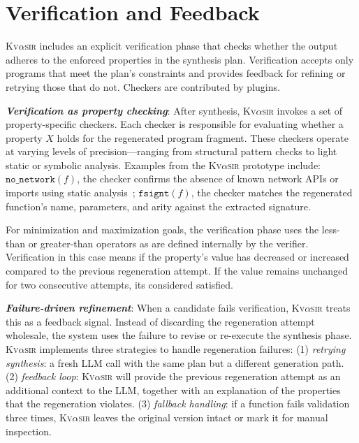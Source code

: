 \documentclass[nonacm,sigplan]{acmart}
\newcommand{\sys}{{\scshape Kv{$\alpha$}sir}\xspace}
\newcommand{\heading}[1]{\vspace{2pt}\noindent\textbf{\emph{#1}}:\enspace}
\newcommand{\ttt}[1]{\texttt{#1}\xspace}
\begin{document}
\section{Verification and Feedback}
\label{sec:verification}

\sys includes an explicit verification phase that checks whether the output adheres to the enforced properties in the synthesis plan. 
Verification accepts only programs that meet the plan's constraints and
provides feedback for refining or retrying those that do not.
Checkers are contributed by plugins.

\heading{Verification as property checking}
After synthesis, \sys invokes a set of property-specific checkers.
Each checker
is responsible for evaluating whether a property $X$ holds
for the regenerated program fragment.
These checkers operate at varying levels
of precision---ranging from structural pattern checks to light static or
symbolic analysis.
Examples from the \sys prototype include:
  $\ttt{no\_network}(f)$, the checker confirms the absence of known network APIs or imports using static analysis~\cite{mir:ccs:2021};
  $\ttt{fsignt}(f)$, the checker matches the regenerated function's name, parameters, and arity against the extracted signature.

For minimization and maximization goals, the verification phase uses the less-than or greater-than operators as are defined internally by the verifier.
Verification in this case means if the property's value has decreased or increased compared 
to the previous regeneration attempt.
If the value remains unchanged for two consecutive attempts, its considered satisfied.

\heading{Failure-driven refinement}
When a candidate fails verification, \sys treats this as a feedback signal. Instead of discarding the regeneration attempt wholesale, the system uses the failure to revise or re-execute the synthesis phase.
\sys implements three strategies to handle regeneration failures:
  (1) \emph{retrying synthesis}: a fresh LLM call with the same plan but a different generation path.
  (2) \emph{feedback loop}: \sys will provide the previous regeneration attempt 
    as an additional context to the LLM, together with an explanation of the properties that the regeneration violates.
  (3) \emph{fallback handling}: if a function fails validation three times, \sys leaves the original version intact or mark it for manual inspection.

\end{document}
